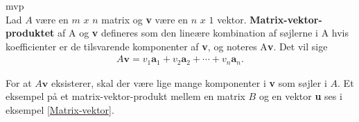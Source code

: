 \begin{defn}{}{mvp}
\phantom{gdfs}\\Lad $A$ være en $m$ $x$ $n$ matrix og \textbf{v} være en $n$ $x$ $1$ vektor. \textbf{Matrix-vektor-produktet} af A og \textbf{v} defineres som den lineære kombination af søjlerne i A hvis koefficienter er de tilsvarende komponenter af \textbf{v}, og noteres A\textbf{v}. Det vil sige
\begin{align*}
A\textbf{v} =v_1\textbf{a}_1 + v_2\textbf{a}_2 + \cdots + v_n\textbf{a}_n.
\end{align*}
\end{defn}
\noindent
For at $A\textbf{v}$ eksisterer, skal der være lige mange komponenter i \textbf{v} som søjler i $A$. Et eksempel på et matrix-vektor-produkt mellem en matrix $B$ og en vektor \textbf{u} ses i eksempel \ref{Matrix-vektor}.
